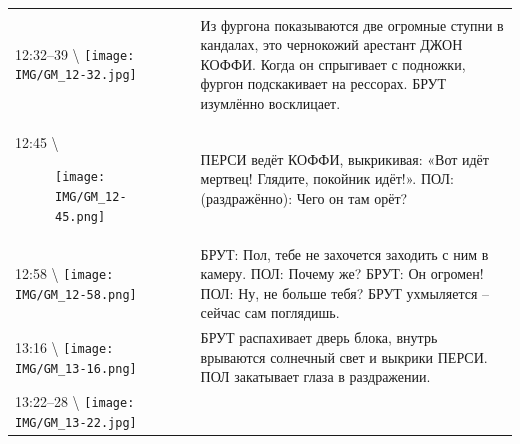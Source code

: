 \begin{longtable}[]{@{}ll@{}}
\begin{minipage}[t]{0.68\columnwidth}
\end{minipage}\tabularnewline
\begin{minipage}[t]{0.27\columnwidth}\raggedright\strut
12:32--39 \textbackslash{}
\texttt{[image: IMG/GM\_12-32.jpg]}\strut
\end{minipage} & \begin{minipage}[t]{0.68\columnwidth}\raggedright\strut
Из фургона показываются две огромные ступни в кандалах,
это чернокожий арестант ДЖОН КОФФИ. Когда он спрыгивает
с подножки, фургон подскакивает на рессорах.
БРУТ изумлённо восклицает.\strut
\end{minipage}\tabularnewline
\begin{minipage}[t]{0.48\columnwidth}\raggedright\strut
12:45 \textbackslash{}

\begin{figure}
\centering
\texttt{[image: IMG/GM\_12-45.png]}
\caption{}
\end{figure}
\strut
\end{minipage} & \begin{minipage}[t]{0.48\columnwidth}\raggedright\strut
ПЕРСИ ведёт КОФФИ, выкрикивая: «Вот идёт мертвец! Глядите,
покойник идёт!».
ПОЛ: (раздражённо): Чего он там орёт?\strut
\end{minipage}\tabularnewline
\begin{minipage}[t]{0.27\columnwidth}\raggedright\strut
12:58 \textbackslash{}
\texttt{[image: IMG/GM\_12-58.png]}\strut
\end{minipage} & \begin{minipage}[t]{0.68\columnwidth}\raggedright\strut
БРУТ: Пол, тебе не захочется заходить с ним в камеру.
ПОЛ: Почему же?
БРУТ: Он огромен!
ПОЛ: Ну, не больше тебя?
БРУТ ухмыляется -- сейчас сам поглядишь.\strut
\end{minipage}\tabularnewline
\begin{minipage}[t]{0.27\columnwidth}\raggedright\strut
13:16 \textbackslash{}
\texttt{[image: IMG/GM\_13-16.png]}\strut
\end{minipage} & \begin{minipage}[t]{0.68\columnwidth}\raggedright\strut
БРУТ распахивает дверь блока, внутрь врываются солнечный
свет и выкрики ПЕРСИ.
ПОЛ закатывает глаза в раздражении.\strut
\end{minipage}\tabularnewline
\begin{minipage}[t]{0.27\columnwidth}\raggedright\strut
13:22--28 \textbackslash{}
\texttt{[image: IMG/GM\_13-22.jpg]}\strut
\end{minipage} & \begin{minipage}[t]{0.68\columnwidth}\raggedright\strut

\end{minipage}
\end{longtable}
